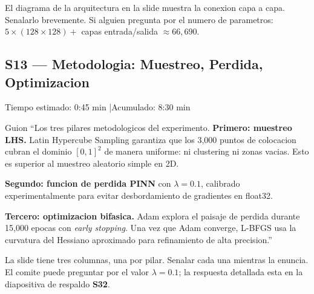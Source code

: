\begin{tipbox}
El diagrama de la arquitectura en la slide muestra la conexion capa a capa.
Senalarlo brevemente. Si alguien pregunta por el numero de parametros:
$5 \times (128 \times 128) + $ capas entrada/salida $\approx 66{,}690$.
\end{tipbox}

\vspace{8pt}

\subsection{S13 --- Metodologia: Muestreo, Perdida, Optimizacion}

\begin{timebox}
Tiempo estimado: 0:45 min \quad|\quad Acumulado: 8:30 min
\end{timebox}
\vspace{4pt}

\begin{slidebox}{Guion}
``Los tres pilares metodologicos del experimento. \textbf{Primero: muestreo LHS.}
Latin Hypercube Sampling garantiza que los 3,000 puntos de colocacion cubran el
dominio $[0,1]^2$ de manera uniforme: ni clustering ni zonas vacias. Esto es
superior al muestreo aleatorio simple en 2D.

\textbf{Segundo: funcion de perdida PINN} con $\lambda = 0.1$, calibrado
experimentalmente para evitar desbordamiento de gradientes en float32.

\textbf{Tercero: optimizacion bifasica.} Adam explora el paisaje de perdida
durante 15,000 epocas con \emph{early stopping}. Una vez que Adam converge,
L-BFGS usa la curvatura del Hessiano aproximado para refinamiento de alta
precision.''
\end{slidebox}
\vspace{4pt}

\begin{tipbox}
La slide tiene tres columnas, una por pilar. Senalar cada una mientras la enuncia.
El comite puede preguntar por el valor $\lambda = 0.1$; la respuesta detallada
esta en la diapositiva de respaldo \textbf{S32}.
\end{tipbox}

\vspace{8pt}

